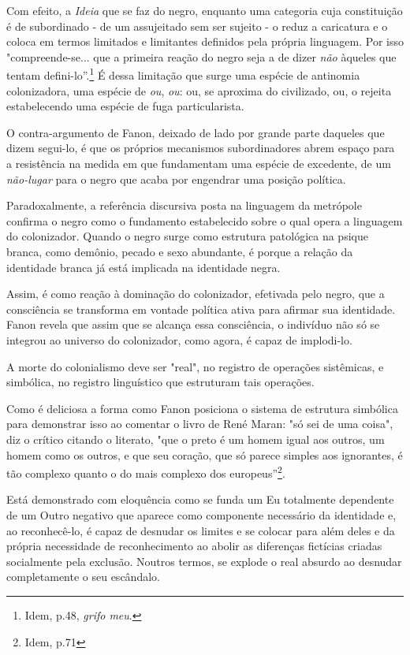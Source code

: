 Com efeito, a \emph{Ideia} que se faz do negro, enquanto uma categoria
cuja constituição é de subordinado - de um assujeitado sem ser sujeito -
o reduz a caricatura e o coloca em termos limitados e limitantes
definidos pela própria linguagem. Por isso "compreende-se... que a
primeira reação do negro seja a de dizer \emph{não} àqueles que tentam
defini-lo''.\footnote{Idem, p.48, \emph{grifo meu}.} É dessa limitação
que surge uma espécie de antinomia colonizadora, uma espécie de
\emph{ou}, \emph{ou}: ou, se aproxima do civilizado, ou, o rejeita
estabelecendo uma espécie de fuga particularista.

O contra-argumento de Fanon, deixado de lado por grande parte daqueles
que dizem segui-lo, é que os próprios mecanismos subordinadores abrem
espaço para a resistência na medida em que fundamentam uma espécie de
excedente, de um \emph{não-lugar} para o negro que acaba por engendrar
uma posição política.

Paradoxalmente, a referência discursiva posta na linguagem da metrópole
confirma o negro como o fundamento estabelecido sobre o qual opera a
linguagem do colonizador. Quando o negro surge como estrutura patológica
na psique branca, como demônio, pecado e sexo abundante, é porque a
relação da identidade branca já está implicada na identidade negra.

Assim, é como reação à dominação do colonizador, efetivada pelo negro,
que a consciência se transforma em vontade política ativa para afirmar
sua identidade. Fanon revela que assim que se alcança essa consciência,
o indivíduo não só se integrou ao universo do colonizador, como agora, é
capaz de implodi-lo.

A morte do colonialismo deve ser "real", no registro de operações
sistêmicas, e simbólica, no registro linguístico que estruturam tais
operações.

Como é deliciosa a forma como Fanon posiciona o sistema de estrutura
simbólica para demonstrar isso ao comentar o livro de René Maran: "só
sei de uma coisa", diz o crítico citando o literato, "que o preto é um
homem igual aos outros, um homem como os outros, e que seu coração, que
só parece simples aos ignorantes, é tão complexo quanto o do mais
complexo dos europeus''\footnote{Idem, p.71}.

Está demonstrado com eloquência como se funda um Eu totalmente
dependente de um Outro negativo que aparece como componente necessário
da identidade e, ao reconhecê-lo, é capaz de desnudar os limites e se
colocar para além deles e da própria necessidade de reconhecimento ao
abolir as diferenças fictícias criadas socialmente pela exclusão.
Noutros termos, se explode o real absurdo ao desnudar completamente o
seu escândalo.

